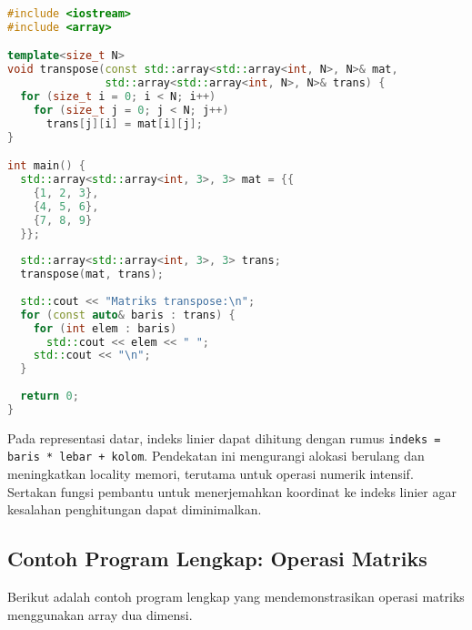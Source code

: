 \documentclass[../main.tex]{subfiles}
\begin{document}
\begin{lstlisting}[language=C++, caption={Operasi matriks di C++}]
#include <iostream>
#include <array>

template<size_t N>
void transpose(const std::array<std::array<int, N>, N>& mat,
               std::array<std::array<int, N>, N>& trans) {
  for (size_t i = 0; i < N; i++)
    for (size_t j = 0; j < N; j++)
      trans[j][i] = mat[i][j];
}

int main() {
  std::array<std::array<int, 3>, 3> mat = {{
    {1, 2, 3},
    {4, 5, 6},
    {7, 8, 9}
  }};
  
  std::array<std::array<int, 3>, 3> trans;
  transpose(mat, trans);
  
  std::cout << "Matriks transpose:\n";
  for (const auto& baris : trans) {
    for (int elem : baris)
      std::cout << elem << " ";
    std::cout << "\n";
  }
  
  return 0;
}
\end{lstlisting}

Pada representasi datar, indeks linier dapat dihitung dengan rumus \texttt{indeks = baris * lebar + kolom}. Pendekatan ini mengurangi alokasi berulang dan meningkatkan locality memori, terutama untuk operasi numerik intensif. Sertakan fungsi pembantu untuk menerjemahkan koordinat ke indeks linier agar kesalahan penghitungan dapat diminimalkan.

\subsection{Contoh Program Lengkap: Operasi Matriks}

Berikut adalah contoh program lengkap yang mendemonstrasikan operasi matriks menggunakan array dua dimensi.
\end{document}
